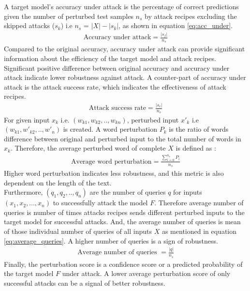 \documentclass[%
	BCOR=8mm, %
	DIV=12,
	toc=bibliography, %
	toc=listof, %
	oneside, %
	egregdoesnotlikesansseriftitles, %
	]{scrbook}
\begin{document}
A target model's accuracy under attack is the percentage of correct predictions given the number of perturbed test samples $n_{s}$ by attack recipes excluding the skipped attacks ($s_{k}$) i.e $n_{s}$ = ${|X|-|s_{k}|}$, as shown in equation \ref{eq:acc_under}. 
 \begin{equation}
    \begin{aligned}
        \mbox{Accuracy under attack}=\frac{|s_{f}|}{n_{s}}
        \label{eq:acc_under}
    \end{aligned}
\end{equation}
Compared to the original accuracy, accuracy under attack can provide significant information about the efficiency of the target model and attack recipes. Significant positive difference between original accuracy and accuracy under attack  indicate lower robustness against attack. A counter-part of accuracy under attack is the attack success rate, which indicates the effectiveness of attack recipes.\\
 \begin{equation}
    \begin{aligned}
        \mbox{Attack success rate}=\frac{|s_{c}|}{n_{s}}
        \label{eq:attack_success_rate}
    \end{aligned}
\end{equation}
For given input $x_{k}$ i.e. $(w_{k1},w_{k2},..,w_{kn})$, perturbed input $x'_{k}$ i.e $(w_{k1},w'_{k2},..,w'_{n})$ is created. A word perturbation $P_{k}$ is the ratio of words difference between original and perturbed input to the total number of words in $x_{k}$. Therefore, the average perturbed word of complete $X$ is defined as :
 \begin{equation}
    \begin{aligned}
        \mbox{Average word perturbation}= \frac{\sum_{i=0}^{n_{s}} P_{i}} {n_{s}}
        \label{eq:attack_success_rate}
    \end{aligned}
\end{equation}
 Higher word perturbation indicates less robustness, and this metric is also dependent on the length of the text. \\
 Furthermore,  $(q_{1},q_{2},..,q_{n})$ are the number of queries $q$ for inputs $(x_{1},x_{2},...,x_{n})$ to successfully attack the model $F$. Therefore average number of queries is number of times attacks recipes sends different perturbed inputs to the target model for successful attacks. And, the average number of queries is mean of those individual number of queries of all inputs $X$ as mentioned in equation \ref{eq:average_queries}. A higher number of queries is a sign of robustness.\\
  \begin{equation}
     \begin{aligned}
         \mbox{Average number of queries }= \frac{|q|} {n_{s}}
         \label{eq:average_queries}
     \end{aligned}
 \end{equation}
Finally, the perturbation score is a confidence score or a predicted probability of the target model $F$ under attack. A lower average perturbation score of only successful attacks can be a signal of better robustness. 
\end{document}
